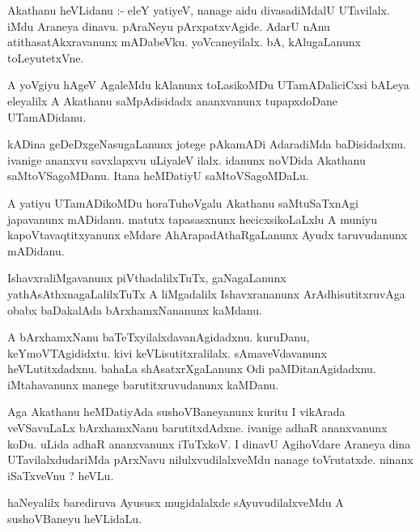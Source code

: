 \documentclass{article}
\begin{document}
\begin{mn}
Akathanu  heVLidanu :- eleY  yatiyeV,  nanage  aidu  divasadiMdalU  UTavilalx.  iMdu  Araneya  dinavu.  pAraNeyu  pArxpatxvAgide.  AdarU  nAnu  
atithasatAkxravanunx  mADabeVku.  yoVcaneyilalx.  bA,  kAlugaLanunx  toLeyutetxVne.
\end{mn}

\begin{mn}
A  yoVgiyu  hAgeV  AgaleMdu  kAlanunx  toLasikoMDu  UTamADaliciCxsi  bALeya  eleyalilx  A  Akathanu  saMpAdisidadx  ananxvanunx  tupapxdoDane  UTamADidanu.
\end{mn}

\begin{mn}
kADina  geDeDxgeNasugaLanunx  jotege  pAkamADi  AdaradiMda  baDisidadxnu.  ivanige  ananxvu  savxlapxvu  uLiyaleV  ilalx.  idanunx  noVDida  Akathanu  
saMtoVSagoMDanu.  Itana  heMDatiyU  saMtoVSagoMDaLu.
\end{mn}

\begin{mn}
A  yatiyu  UTamADikoMDu  horaTuhoVgalu  Akathanu  saMtuSaTxnAgi  japavanunx  mADidanu.  matutx  tapasasxnunx  hecicxsikoLaLxlu  A  muniyu  
kapoVtavaqtitxyanunx  eMdare  AhArapadAthaRgaLanunx  Ayudx  taruvudanunx  mADidanu.
\end{mn}

\begin{mn}
IshavxraliMgavanunx  piVthadalilxTuTx,  gaNagaLanunx  yathAsAthxnagaLalilxTuTx  A  liMgadalilx  Ishavxrananunx  ArAdhisutitxruvAga  
obabx  baDakalAda  bArxhamxNananunx  kaMdanu.
\end{mn}

\begin{mn}
A  bArxhamxNanu  baTeTxyilalxdavanAgidadxnu.  kuruDanu,  keYmoVTAgididxtu.  kivi  keVLisutitxralilalx.  sAmaveVdavanunx  
heVLutitxdadxnu.  bahaLa  shAsatxrXgaLanunx  Odi  paMDitanAgidadxnu.  iMtahavanunx  manege  barutitxruvudanunx  kaMDanu.
\end{mn}

\begin{mn}
Aga  Akathanu  heMDatiyAda  sushoVBaneyanunx  kuritu  I  vikArada  veVSavuLaLx  bArxhamxNanu  barutitxdAdxne.  ivanige  
adhaR  ananxvanunx  koDu.  uLida  adhaR  ananxvanunx  iTuTxkoV.  I  dinavU  AgihoVdare  Araneya  dina  UTavilalxdudariMda  
pArxNavu  nilulxvudilalxveMdu  nanage  toVrutatxde.  ninanx  iSaTxveVnu ?  heVLu.
\end{mn}

\begin{mn}
haNeyalilx  barediruva  Ayususx  mugidalalxde  sAyuvudilalxveMdu  A  sushoVBaneyu  heVLidaLu.
\end{mn}
\end{document}
